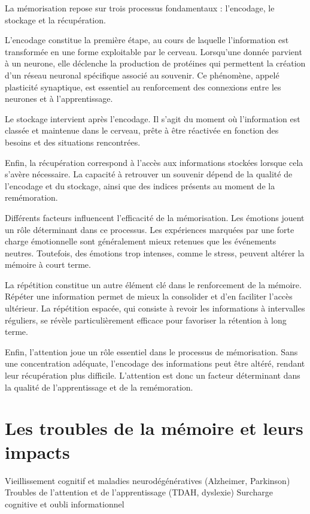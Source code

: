 \documentclass[12pt,a4paper]{report}
\begin{document}
La mémorisation repose sur trois processus fondamentaux : l'encodage, le stockage et la récupération.

L'encodage constitue la première étape, au cours de laquelle l'information est transformée en une forme exploitable par le cerveau. Lorsqu'une donnée parvient à un neurone, elle déclenche la production de protéines qui permettent la création d’un réseau neuronal spécifique associé au souvenir. Ce phénomène, appelé plasticité synaptique, est essentiel au renforcement des connexions entre les neurones et à l’apprentissage.

Le stockage intervient après l’encodage. Il s'agit du moment où l’information est classée et maintenue dans le cerveau, prête à être réactivée en fonction des besoins et des situations rencontrées.

Enfin, la récupération correspond à l'accès aux informations stockées lorsque cela s’avère nécessaire. La capacité à retrouver un souvenir dépend de la qualité de l'encodage et du stockage, ainsi que des indices présents au moment de la remémoration.

Différents facteurs influencent l’efficacité de la mémorisation. Les émotions jouent un rôle déterminant dans ce processus. Les expériences marquées par une forte charge émotionnelle sont généralement mieux retenues que les événements neutres. Toutefois, des émotions trop intenses, comme le stress, peuvent altérer la mémoire à court terme.

La répétition constitue un autre élément clé dans le renforcement de la mémoire. Répéter une information permet de mieux la consolider et d’en faciliter l’accès ultérieur. La répétition espacée, qui consiste à revoir les informations à intervalles réguliers, se révèle particulièrement efficace pour favoriser la rétention à long terme.

Enfin, l'attention joue un rôle essentiel dans le processus de mémorisation. Sans une concentration adéquate, l’encodage des informations peut être altéré, rendant leur récupération plus difficile. L’attention est donc un facteur déterminant dans la qualité de l’apprentissage et de la remémoration.

\section{Les troubles de la mémoire et leurs impacts}
Vieillissement cognitif et maladies neurodégénératives (Alzheimer, Parkinson)
Troubles de l'attention et de l'apprentissage (TDAH, dyslexie)
Surcharge cognitive et oubli informationnel
\end{document}

